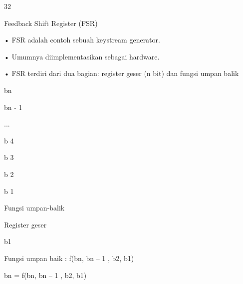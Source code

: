\documentclass{article}
\begin{document}

32

Feedback Shift Register (FSR)

• FSR adalah contoh sebuah keystream generator.

• Umumnya diimplementasikan sebagai hardware.

• FSR terdiri dari dua bagian: register geser (n bit) dan fungsi umpan balik 







 bn

bn - 1

...

b 4

b 3

b 2

b 1

Fungsi umpan-balik

Register geser

b1

Fungsi umpan baik :  f(bn, bn – 1 , b2, b1)

bn  = f(bn, bn – 1 , b2, b1)
\end{document}

